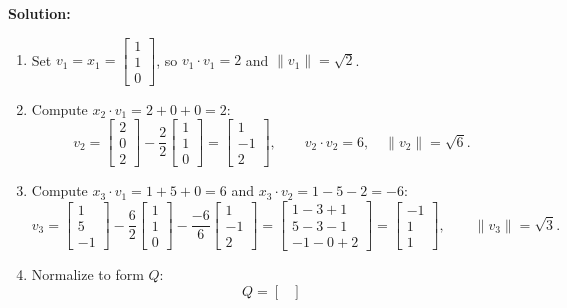 \documentclass[11pt, letterpaper]{article}
\theoremstyle{definition}
\theoremstyle{remark}
\begin{document}
\textbf{Solution:}
\begin{enumerate}[label=\textbf{Step \arabic*:}]
    \item Set $v_1 = x_1 = \begin{bmatrix} 1 \\ 1 \\ 0 \end{bmatrix}$, so $v_1 \cdot v_1 = 2$ and $\|v_1\| = \sqrt{2}$.
    \item Compute $x_2 \cdot v_1 = 2 + 0 + 0 = 2$:
    \[
        v_2 = \begin{bmatrix} 2 \\ 0 \\ 2 \end{bmatrix} - \frac{2}{2}\begin{bmatrix} 1 \\ 1 \\ 0 \end{bmatrix} = \begin{bmatrix} 1 \\ -1 \\ 2 \end{bmatrix}, \qquad v_2 \cdot v_2 = 6, \quad \|v_2\| = \sqrt{6}.
    \]
    \item Compute $x_3 \cdot v_1 = 1 + 5 + 0 = 6$ and $x_3 \cdot v_2 = 1 - 5 - 2 = -6$:
    \[
        v_3 = \begin{bmatrix} 1 \\ 5 \\ -1 \end{bmatrix} - \frac{6}{2}\begin{bmatrix} 1 \\ 1 \\ 0 \end{bmatrix} - \frac{-6}{6}\begin{bmatrix} 1 \\ -1 \\ 2 \end{bmatrix}
        = \begin{bmatrix} 1 - 3 + 1 \\ 5 - 3 - 1 \\ -1 - 0 + 2 \end{bmatrix}
        = \begin{bmatrix} -1 \\ 1 \\ 1 \end{bmatrix}, \qquad \|v_3\| = \sqrt{3}.
    \]
    \item Normalize to form $Q$:
    \[
        Q = \begin{bmatrix}

\end{bmatrix}\]
\end{enumerate}
\end{document}
